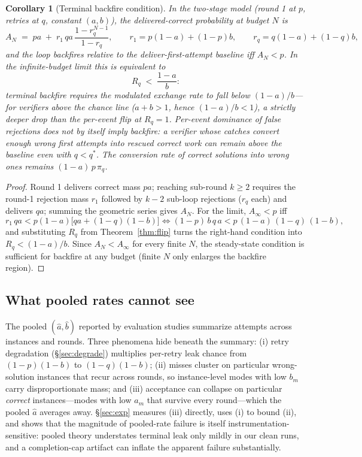 \documentclass[10pt]{article}
\newtheorem{corollary}{Corollary}
\begin{document}
\begin{corollary}[Terminal backfire condition]\label{cor:backfire}
In the two-stage model (round 1 at $p$, retries at $q$, constant
$(a,b)$), the delivered-correct probability at budget $N$ is
\[
A_N \;=\; pa \;+\; r_1\, qa\, \frac{1-r_q^{N-1}}{1-r_q},
\qquad
r_1 = p(1-a) + (1-p)b, \qquad
r_q = q(1-a) + (1-q)b,
\]
and the loop backfires relative to the deliver-first-attempt baseline
iff $A_N < p$.  In the infinite-budget limit this is equivalent to
\[
R_q \;<\; \frac{1-a}{b}:
\]
terminal backfire requires the modulated exchange rate to fall below
$(1-a)/b$---for verifiers above the chance line ($a+b>1$, hence
$(1-a)/b<1$), a strictly deeper drop than the per-event flip at
$R_q=1$.  Per-event dominance of false rejections does not by itself
imply backfire: a verifier whose catches convert enough wrong first
attempts into rescued correct work can remain above the baseline even
with $q < q^\ast$.  The conversion rate of correct solutions into
wrong ones remains $(1-a)\,p\,\pi_q$.
\end{corollary}

\begin{proof}
Round 1 delivers correct mass $pa$; reaching sub-round $k \ge 2$
requires the round-1 rejection mass $r_1$ followed by $k-2$ sub-loop
rejections ($r_q$ each) and delivers $qa$; summing the geometric
series gives $A_N$.  For the limit, $A_\infty < p$ iff
\[
r_1\,qa < p(1-a)\bigl[qa+(1-q)(1-b)\bigr]
\iff
(1-p)\,b\,q\,a < p\,(1-a)\,(1-q)\,(1-b),
\]
and substituting $R_q$ from Theorem~\ref{thm:flip} turns the
right-hand condition into $R_q < (1-a)/b$.  Since $A_N < A_\infty$ for
every finite $N$, the steady-state condition is sufficient for
backfire at any budget (finite $N$ only enlarges the backfire
region).
\end{proof}

\subsection{What pooled rates cannot see}\label{sec:cluster}

The pooled $(\hat a, \hat b)$ reported by evaluation studies
summarize attempts across instances and rounds.  Three phenomena
hide beneath the summary: (i) retry degradation
(§\ref{sec:degrade}) multiplies per-retry leak chance from
$(1-p)(1-b)$ to $(1-q)(1-b)$; (ii) misses cluster on particular
wrong-solution instances that recur across rounds, so
instance-level modes with low $b_m$ carry disproportionate mass;
and (iii) acceptance can collapse on particular \emph{correct}
instances---modes with low $a_m$ that survive every round---which
the pooled $\hat a$ averages away.  §\ref{sec:exp} measures (iii)
directly, uses (i) to bound (ii), and shows that the magnitude of
pooled-rate failure is itself instrumentation-sensitive: pooled
theory understates terminal leak only mildly in our clean runs,
and a completion-cap artifact can inflate the apparent failure
substantially.
\end{document}
